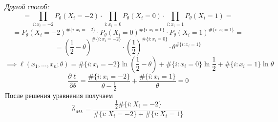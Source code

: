 {    \textit{Другой способ:}
    \[=\prod_{i:x_i=-2}P_\theta(X_i = -2) \cdot \prod_{i:x_i=0}P_\theta(X_i = 0) \cdot \prod_{i:x_i=1}P_\theta(X_i = 1) =\]
    \[= P_{\theta}(X_i = -2)^{\#\{i:x_i=-2\}} \cdot P_{\theta}(X_i = 0)^{\#\{i:x_i=0\}} \cdot P_{\theta}(X_i = 1)^{\#\{i:x_i=1\}}= \]
    \[= \left(\frac{1}{2} - \theta\right)^{\#\{i:x_i=-2\}} \cdot \left(\frac{1}{2}\right)^{\#\{i:x_i=0\}} \cdot \theta^{\#\{i:x_i=1\}}\]
    \[\implies \ell(x_1,\dots,x_n;\theta) = \#\{i:x_i=-2\}\ln\left(\frac{1}{2} - \theta\right) + \#\{i:x_i=0\}\ln\frac{1}{2} + \#\{i:x_i=1\}\ln \theta\]
    \[\frac{\partial \ell}{\partial \theta} = \frac{\#\{i:x_i=-2\}}{\theta - \frac{1}{2}} + \frac{\#\{i:x_i=1\}}{\theta} = 0\]
    После решения уравнения получаем
    \[\widehat{\theta}_{ML} = \frac{\frac{1}{2}\#\{i: X_i = -2\}}{\#\{i: X_i = -2\} + \#\{i: X_i = 1\}}\]
}
\setcounter{maindf}{6}
\setcounter{subdf}{0}

\setcounter{mainth}{6}
\setcounter{subth}{0}

\setcounter{mainpr}{6}
\setcounter{subpr}{0}

\setcounter{mainex}{6}
\setcounter{subex}{0}

\setcounter{mainta}{6}
\setcounter{subta}{0}

\setcounter{mainle}{6}
\setcounter{suble}{0}

